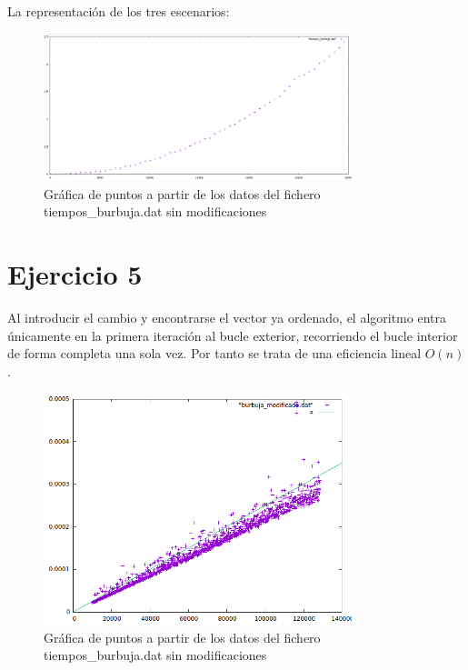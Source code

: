 \documentclass[paper=a4, fontsize=10pt]{scrartcl} %
\begin{document}
La representación de los tres escenarios:

\begin{figure}[H] %
	\centering
	\label{lsblk}
	\includegraphics[width=0.8\textwidth]{../imgs/c1.PNG}
	\caption{Gráfica de puntos a partir de los datos del fichero tiempos\_burbuja.dat sin modificaciones} 
\end{figure}


\section{Ejercicio 5}

Al introducir el cambio y encontrarse el vector ya ordenado, el algoritmo entra únicamente en la primera iteración al bucle exterior, recorriendo el bucle interior de forma completa una sola vez. Por tanto se trata de una eficiencia lineal $O(n)$.

\begin{figure}[H] %
	\centering
	\label{lsblk}
	\includegraphics[width=0.8\textwidth]{../imgs/ejercicio5.PNG}
	\caption{Gráfica de puntos a partir de los datos del fichero tiempos\_burbuja.dat sin modificaciones} 
\end{figure}


\end{document}
